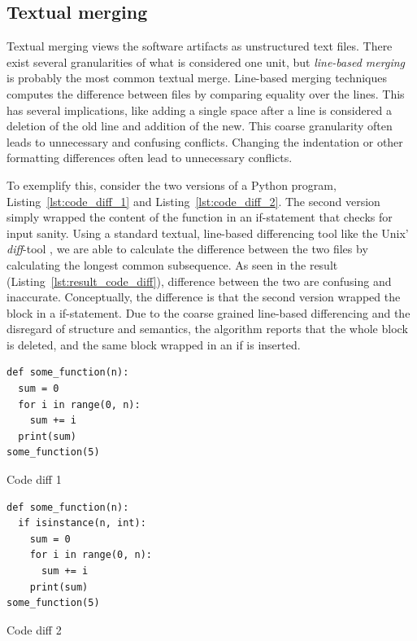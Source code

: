 \documentclass[a4paper,english]{ifimaster}
\begin{document}
\subsection{Textual merging}%
\label{sub:textual_merging}

Textual merging views the software artifacts as unstructured text files. There exist several granularities of what is considered one unit, but \textit{line-based merging} is probably the most common textual merge. Line-based merging techniques computes the difference between files by comparing equality over the lines. This has several implications, like adding a single space after a line is considered a deletion of the old line and addition of the new. This coarse granularity often leads to unnecessary and confusing conflicts. Changing the indentation or other formatting differences often lead to unnecessary conflicts.

To exemplify this, consider the two versions of a Python program, Listing~\vref{lst:code_diff_1} and Listing~\vref{lst:code_diff_2}. The second version simply wrapped the content of the function in an if-statement that checks for input sanity. Using a standard textual, line-based differencing tool like the Unix' \textit{diff}-tool \cite{cite:fast_algo_for_lcs}, we are able to calculate the difference between the two files by calculating the longest common subsequence. As seen in the result (Listing~\vref{lst:result_code_diff}), difference between the two are confusing and inaccurate. Conceptually, the difference is that the second version wrapped the block in a if-statement. Due to the coarse grained line-based differencing and the disregard of structure and semantics, the algorithm reports that the whole block is deleted, and the same block wrapped in an if is inserted.

\begin{listing}
	\begin{verbatim}
def some_function(n):
  sum = 0
  for i in range(0, n):
    sum += i
  print(sum)
some_function(5)

  \end{verbatim}
	\caption{Code diff 1}
	\label{lst:code_diff_1}
\end{listing}

\begin{listing}
	\begin{verbatim}
def some_function(n):
  if isinstance(n, int):
    sum = 0
    for i in range(0, n):
      sum += i
    print(sum)
some_function(5)
  \end{verbatim}
	\caption{Code diff 2}
	\label{lst:code_diff_2}
\end{listing}
\end{document}
